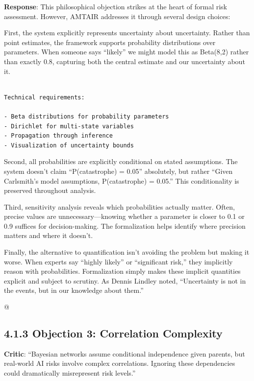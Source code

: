 \documentclass[
  11pt,
  letterpaper,
]{book}
\begin{document}
\textbf{Response}: This philosophical objection strikes at the heart of
formal risk assessment. However, AMTAIR addresses it through several
design choices:

First, the system explicitly represents uncertainty about uncertainty.
Rather than point estimates, the framework supports probability
distributions over parameters. When someone says ``likely'' we might
model this as Beta(8,2) rather than exactly 0.8, capturing both the
central estimate and our uncertainty about it.

\begin{verbatim}

Technical requirements:

- Beta distributions for probability parameters
- Dirichlet for multi-state variables
- Propagation through inference
- Visualization of uncertainty bounds
\end{verbatim}

Second, all probabilities are explicitly conditional on stated
assumptions. The system doesn't claim ``P(catastrophe) = 0.05''
absolutely, but rather ``Given Carlsmith's model assumptions,
P(catastrophe) = 0.05.'' This conditionality is preserved throughout
analysis.

Third, sensitivity analysis reveals which probabilities actually matter.
Often, precise values are unnecessary---knowing whether a parameter is
closer to 0.1 or 0.9 suffices for decision-making. The formalization
helps identify where precision matters and where it doesn't.

Finally, the alternative to quantification isn't avoiding the problem
but making it worse. When experts say ``highly likely'' or ``significant
risk,'' they implicitly reason with probabilities. Formalization simply
makes these implicit quantities explicit and subject to scrutiny. As
Dennis Lindley noted, ``Uncertainty is not in the events, but in our
knowledge about them.''

@\textcite{lindley2013}

\subsection*{4.1.3 Objection 3: Correlation
Complexity}\label{sec-correlation-complexity}

\textbf{Critic}: ``Bayesian networks assume conditional independence
given parents, but real-world AI risks involve complex correlations.
Ignoring these dependencies could dramatically misrepresent risk
levels.''
\end{document}

